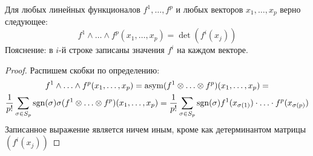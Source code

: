 \begin{lemma}
	Для любых линейных функционалов $f^1, \ldots, f^p$ и любых векторов $x_1, \ldots, x_p$ верно следующее:
	\[
		f^1 \wedge \ldots \wedge f^p(x_1, \ldots, x_p) = \det(f^i(x_j))
	\]
	Пояснение: в $i$-й строке записаны значения $f^i$ на каждом векторе.
\end{lemma}

\begin{proof}
	Распишем скобки по определению:
	\begin{multline*}
		f^1 \wedge \ldots \wedge f^p(x_1, \ldots, x_p) = \operatorname{asym}(f^1 \otimes \ldots \otimes f^p)(x_1, \ldots, x_p) =
		\\
		\frac{1}{p!} \sum_{\sigma \in S_p} \operatorname{sgn}(\sigma) \sigma (f^1 \otimes \ldots \otimes f^p)(x_1, \ldots, x_p) = \frac{1}{p!} \sum_{\sigma \in S_p} \operatorname{sgn}(\sigma) f^1(x_{\sigma(1)}) \cdot \ldots \cdot f^p(x_{\sigma(p)})
	\end{multline*}
	Записанное выражение является ничем иным, кроме как детерминантом матрицы $(f^i(x_j))$
\end{proof}